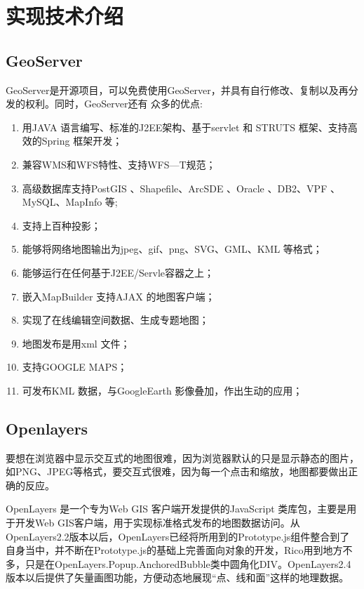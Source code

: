 
\chapter{实现技术介绍}



\section{GeoServer}
  GeoServer是开源项目，可以免费使用GeoServer，并具有自行修改、复制以及再分发的权利。同时，GeoServer还有 众多的优点:


\begin{enumerate}
 
   \item 用JAVA 语言编写、标准的J2EE架构、基于servlet 和 STRUTS 框架、支持高效的Spring 框架开发；
   \item 兼容WMS和WFS特性、支持WFS—T规范；
   \item 高级数据库支持PostGIS 、Shapefile、ArcSDE 、Oracle 、DB2、VPF 、MySQL、MapInfo 等;
   \item 支持上百种投影；
   \item 能够将网络地图输出为jpeg、gif、png、SVG、GML、KML 等格式；
   \item 能够运行在任何基于J2EE/Servle容器之上；
   \item 嵌入MapBuilder 支持AJAX 的地图客户端；
   \item 实现了在线编辑空间数据、生成专题地图；
   \item 地图发布是用xml 文件；
   \item 支持GOOGLE MAPS；
   \item 可发布KML 数据，与GoogleEarth 影像叠加，作出生动的应用；
\end{enumerate}



\section{Openlayers}
要想在浏览器中显示交互式的地图很难，因为浏览器默认的只是显示静态的图片，如PNG、JPEG等格式，要交互式很难，因为每一个点击和缩放，地图都要做出正确的反应。

OpenLayers 是一个专为Web GIS 客户端开发提供的JavaScript 类库包，主要是用于开发Web GIS客户端，用于实现标准格式发布的地图数据访问。从OpenLayers2.2版本以后，OpenLayers已经将所用到的Prototype.js组件整合到了自身当中，并不断在Prototype.js的基础上完善面向对象的开发，Rico用到地方不多，只是在OpenLayers.Popup.AnchoredBubble类中圆角化DIV。OpenLayers2.4版本以后提供了矢量画图功能，方便动态地展现“点、线和面”这样的地理数据。

